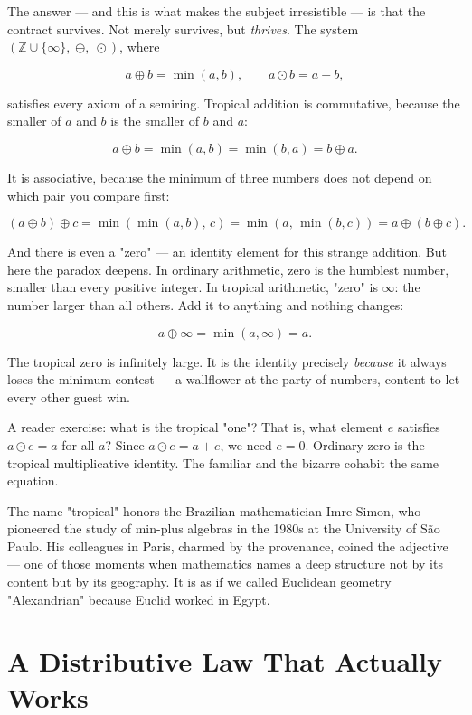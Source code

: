 \documentclass[11pt,twoside,openright]{book}
\theoremstyle{definition}
\theoremstyle{remark}
\begin{document}
The answer --- and this is what makes the subject irresistible --- is that the contract survives. Not merely survives, but \textit{thrives}. The system $(\mathbb{Z} \cup \{\infty\},\; \oplus,\; \odot)$, where

\[a \oplus b = \min(a, b), \qquad a \odot b = a + b,\]

satisfies every axiom of a semiring. Tropical addition is commutative, because the smaller of $a$ and $b$ is the smaller of $b$ and $a$:

\[a \oplus b = \min(a,b) = \min(b,a) = b \oplus a.\]

It is associative, because the minimum of three numbers does not depend on which pair you compare first:

\[(a \oplus b) \oplus c = \min(\min(a,b),\, c) = \min(a,\, \min(b,c)) = a \oplus (b \oplus c).\]

And there is even a "zero" --- an identity element for this strange addition. But here the paradox deepens. In ordinary arithmetic, zero is the humblest number, smaller than every positive integer. In tropical arithmetic, "zero" is $\infty$: the number larger than all others. Add it to anything and nothing changes:

\[a \oplus \infty = \min(a, \infty) = a.\]

The tropical zero is infinitely large. It is the identity precisely \textit{because} it always loses the minimum contest --- a wallflower at the party of numbers, content to let every other guest win.

A reader exercise: what is the tropical "one"? That is, what element $e$ satisfies $a \odot e = a$ for all $a$? Since $a \odot e = a + e$, we need $e = 0$. Ordinary zero is the tropical multiplicative identity. The familiar and the bizarre cohabit the same equation.

The name "tropical" honors the Brazilian mathematician Imre Simon, who pioneered the study of min-plus algebras in the 1980s at the University of São Paulo. His colleagues in Paris, charmed by the provenance, coined the adjective --- one of those moments when mathematics names a deep structure not by its content but by its geography. It is as if we called Euclidean geometry "Alexandrian" because Euclid worked in Egypt.


\section{A Distributive Law That Actually Works}
\end{document}
